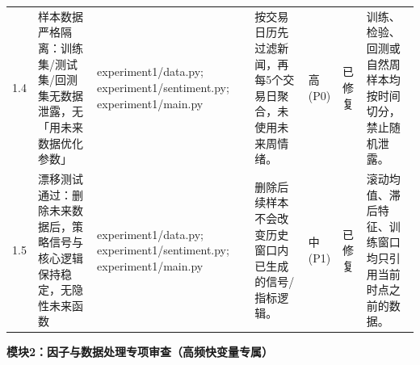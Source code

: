\begin{longtable}{@{}L{0.045\textwidth}L{0.190\textwidth}L{0.140\textwidth}L{0.190\textwidth}L{0.060\textwidth}L{0.060\textwidth}L{0.205\textwidth}@{}}
1.4 & 样本数据严格隔离：训练集/\allowbreak{}测试集/\allowbreak{}回测集无数据泄露，无「用未来数据优化参数」 & experiment1/\allowbreak{}data.py;\allowbreak{} experiment1/\allowbreak{}sentiment.py;\allowbreak{} experiment1/\allowbreak{}main.py & 按交易日历先过滤新闻，再每5个交易日聚合，未使用未来周情绪。 & 高(P0) & 已修复 & 训练、检验、回测或自然周样本均按时间切分，禁止随机泄露。 \\
1.5 & 漂移测试通过：删除未来数据后，策略信号与核心逻辑保持稳定，无隐性未来函数 & experiment1/\allowbreak{}data.py;\allowbreak{} experiment1/\allowbreak{}sentiment.py;\allowbreak{} experiment1/\allowbreak{}main.py & 删除后续样本不会改变历史窗口内已生成的信号/\allowbreak{}指标逻辑。 & 中(P1) & 已修复 & 滚动均值、滞后特征、训练窗口均只引用当前时点之前的数据。 \\
\end{longtable}
\endgroup

\textbf{模块2：因子与数据处理专项审查（高频快变量专属）}

